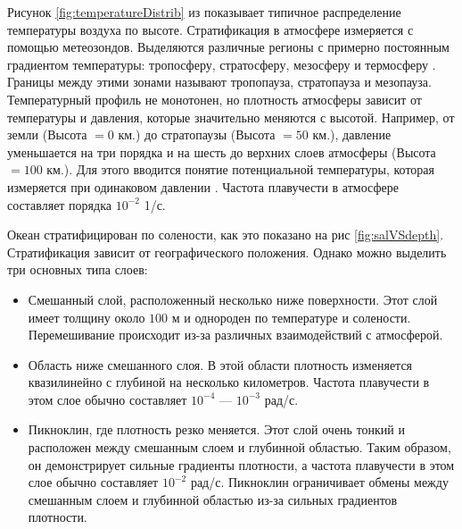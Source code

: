 Рисунок \ref{fig:temperatureDistrib} из \cite{geoThermins} показывает типичное распределение температуры воздуха по высоте. Стратификация в атмосфере измеряется с помощью метеозондов. Выделяются различные регионы с примерно постоянным градиентом температуры: тропосферу, стратосферу, мезосферу и термосферу \cite{saha2008the}. Границы между этими зонами называют тропопауза, стратопауза и мезопауза. Температурный профиль не монотонен, но плотность атмосферы зависит от температуры и давления, которые значительно меняются с высотой. Например, от земли (Высота $= 0$ км.) до стратопаузы (Высота $= 50$ км.), давление уменьшается на три порядка и на шесть до верхних слоев атмосферы (Высота $= 100$ км.). Для этого вводится понятие потенциальной температуры, которая измеряется при одинаковом давлении \cite{gidrometDict}.  Частота плавучести в атмосфере составляет порядка $10^{-2}$ 1/с. 

Океан стратифицирован по солености, как это показано на рис \ref{fig:salVSdepth}. Стратификация зависит от географического положения. Однако можно выделить три основных типа слоев:

\begin{itemize}
    \item Смешанный слой, расположенный несколько ниже поверхности. Этот слой имеет толщину около $100$ м и однороден по температуре и солености. Перемешивание происходит из-за различных взаимодействий с атмосферой. 
    
    \item Область ниже смешанного слоя. В этой области плотность изменяется квазилинейно с глубиной на несколько километров. Частота плавучести в этом слое обычно составляет $10^{-4}$ --- $10^{-3}$ рад/с.
    
    \item Пикноклин, где плотность резко меняется. Этот слой очень тонкий и расположен между смешанным слоем и глубинной областью. Таким образом, он демонстрирует сильные градиенты плотности, а частота плавучести в этом слое обычно составляет $10^{-2}$ рад/с. Пикноклин ограничивает обмены между смешанным слоем и глубинной областью из-за сильных градиентов плотности.
\end{itemize}


